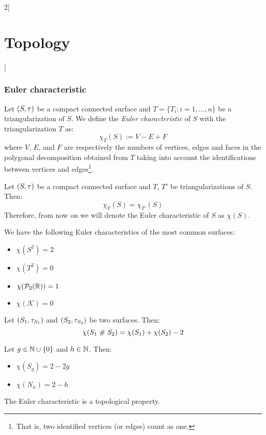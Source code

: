 \documentclass[../../../main.tex]{subfiles}
\begin{document}
\begin{multicols}{2}[\section{Topology}]
  \subsubsection{Euler characteristic}
  \begin{definition}
    Let $(S,\tau)$ be a compact connected surface and $T=\{T_i:i=1,\ldots,n\}$ be a triangularization of $S$. We define the \emph{Euler characteristic} of $S$ with the triangularization $T$ as: $$\chi_T(S):=V-E+F$$ where $V$, $E$, and $F$ are respectively the numbers of vertices, edges and faces in the polygonal decomposition obtained from $T$ taking into account the identifications between vertices and edges\footnote{That is, two identified vertices (or edges) count as one.}.
  \end{definition}
  \begin{proposition}
    Let $(S,\tau)$ be a compact connected surface and $T$, $T'$ be triangularizations of $S$. Then: $$\chi_T(S)=\chi_{T'}(S)$$ Therefore, from now on we will denote the Euler characteristic of $S$ as $\chi(S)$.
  \end{proposition}
  \begin{proposition}
    We have the following Euler characteristics of the most common surfaces:
    \begin{itemize}
      \item $\chi(S^2)=2$
      \item $\chi(T^2)=0$
      \item $\chi(\mathcal{P}_2(\mathbb{R}))=1$
      \item $\chi(\mathcal{K})=0$
    \end{itemize}
  \end{proposition}
  \begin{proposition}
    Let $(S_1,\tau_{S_1})$ and $(S_2,\tau_{S_2})$ be two surfaces. Then: $$\chi(S_1\mathrel{\#} S_2)=\chi(S_1)+\chi(S_2)-2$$
  \end{proposition}
  \begin{corollary}
    Let $g\in\mathbb{N}\cup\{0\}$ and $h\in\mathbb{N}$. Then:
    \begin{itemize}
      \item $\chi(S_g)=2-2g$
      \item $\chi(N_h)=2-h$
    \end{itemize}
  \end{corollary}
  \begin{theorem}
    The Euler characteristic is a topological property.
  \end{theorem}
  \begin{theorem}

\end{theorem}
\end{multicols}
\end{document}

